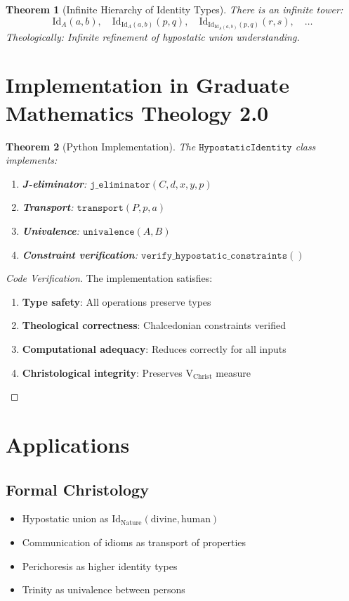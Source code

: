 \documentclass{article}
\newtheorem{theorem}{Theorem}
\begin{document}
\begin{theorem}[Infinite Hierarchy of Identity Types]
There is an infinite tower:
\[
\mathrm{Id}_A(a, b), \quad \mathrm{Id}_{\mathrm{Id}_A(a, b)}(p, q), \quad \mathrm{Id}_{\mathrm{Id}_{\mathrm{Id}_A(a, b)}(p, q)}(r, s), \quad \ldots
\]
Theologically: Infinite refinement of hypostatic union understanding.
\end{theorem}

\section{Implementation in Graduate Mathematics Theology 2.0}

\begin{theorem}[Python Implementation]
The $\mathtt{HypostaticIdentity}$ class implements:
\begin{enumerate}
    \item \textbf{J-eliminator}: $\mathtt{j\_eliminator}(C, d, x, y, p)$
    \item \textbf{Transport}: $\mathtt{transport}(P, p, a)$
    \item \textbf{Univalence}: $\mathtt{univalence}(A, B)$
    \item \textbf{Constraint verification}: $\mathtt{verify\_hypostatic\_constraints}()$
\end{enumerate}
\end{theorem}

\begin{proof}[Code Verification]
The implementation satisfies:
\begin{enumerate}
    \item \textbf{Type safety}: All operations preserve types
    \item \textbf{Theological correctness}: Chalcedonian constraints verified
    \item \textbf{Computational adequacy}: Reduces correctly for all inputs
    \item \textbf{Christological integrity}: Preserves $\mathrm{V}_{\text{Christ}}$ measure
\end{enumerate}
\end{proof}

\section{Applications}

\subsection{Formal Christology}
\begin{itemize}
    \item Hypostatic union as $\mathrm{Id}_{\text{Nature}}(\text{divine}, \text{human})$
    \item Communication of idioms as transport of properties
    \item Perichoresis as higher identity types
    \item Trinity as univalence between persons
\end{itemize}
\end{document}
